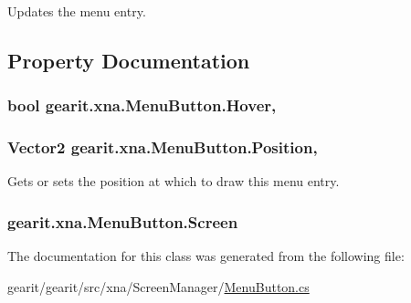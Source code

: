 Updates the menu entry. 



\subsection{Property Documentation}
\hypertarget{classgearit_1_1xna_1_1_menu_button_a1e92a886d3a62f2783421dedc924979b}{
\subsubsection[{Hover}]{\setlength{\rightskip}{0pt plus 5cm}bool gearit.\+xna.\+Menu\+Button.\+Hover\hspace{0.3cm}{\ttfamily [get]}, {\ttfamily [set]}}}\label{classgearit_1_1xna_1_1_menu_button_a1e92a886d3a62f2783421dedc924979b}
\hypertarget{classgearit_1_1xna_1_1_menu_button_ae7394c4d763ad14ca3bc3a614f72121a}{
\subsubsection[{Position}]{\setlength{\rightskip}{0pt plus 5cm}Vector2 gearit.\+xna.\+Menu\+Button.\+Position\hspace{0.3cm}{\ttfamily [get]}, {\ttfamily [set]}}}\label{classgearit_1_1xna_1_1_menu_button_ae7394c4d763ad14ca3bc3a614f72121a}


Gets or sets the position at which to draw this menu entry. 

\hypertarget{classgearit_1_1xna_1_1_menu_button_a504a15662cd6c21cec0723698d56a226}{
\subsubsection[{Screen}]{ gearit.\+xna.\+Menu\+Button.\+Screen\hspace{0.3cm}{\ttfamily [get]}}}\label{classgearit_1_1xna_1_1_menu_button_a504a15662cd6c21cec0723698d56a226}


The documentation for this class was generated from the following file\+:\begin{DoxyCompactItemize}
\item 
gearit/gearit/src/xna/\+Screen\+Manager/\hyperlink{_menu_button_8cs}{Menu\+Button.\+cs}\end{DoxyCompactItemize}
